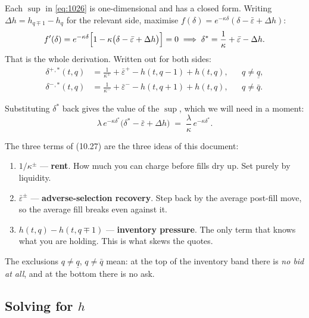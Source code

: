 \documentclass[11pt,a4paper]{article}
\newcommand{\dplus}{\delta^{+}}
\newcommand{\dminus}{\delta^{-}}
\newcommand{\epsb}{\bar{\varepsilon}}
\begin{document}
Each $\sup$ in \eqref{eq:1026} is one-dimensional and has a closed form. Writing
$\Delta h = h_{q\mp1} - h_q$ for the relevant side, maximise
$f(\delta) = e^{-\kappa\delta}(\delta - \epsb + \Delta h)$:
\[
  f'(\delta) = e^{-\kappa\delta}\Bigl[1 - \kappa\bigl(\delta - \epsb + \Delta h\bigr)\Bigr] = 0
  \;\Longrightarrow\;
  \delta^{*} = \frac{1}{\kappa} + \epsb - \Delta h .
\]
That is the whole derivation. Written out for both sides:
\begin{equation}
\boxed{
\begin{aligned}
  \dplus{}^{,*}(t,q) &= \frac{1}{\kappa^{+}} + \epsb^{+} - h(t,q-1) + h(t,q),
    &&q \ne \underline{q},\\[2pt]
  \dminus{}^{,*}(t,q) &= \frac{1}{\kappa^{-}} + \epsb^{-} - h(t,q+1) + h(t,q),
    &&q \ne \bar{q}.
\end{aligned}}
  \tag{10.27}
  \label{eq:1027}
\end{equation}

Substituting $\delta^*$ back gives the value of the $\sup$, which we will need in
a moment:
\begin{equation}
  \lambda\, e^{-\kappa\delta^{*}}\bigl(\delta^{*} - \epsb + \Delta h\bigr)
  \;=\; \frac{\lambda}{\kappa}\, e^{-\kappa\delta^{*}} .
  \label{eq:supvalue}
\end{equation}

\begin{intuition}
The three terms of (10.27) are the three ideas of this document:
\begin{enumerate}[nosep]
  \item $1/\kappa^{\pm}$ --- \textbf{rent}. How much you can charge before fills
    dry up. Set purely by liquidity.
  \item $\epsb^{\pm}$ --- \textbf{adverse-selection recovery}. Step back by the
    average post-fill move, so the average fill breaks even against it.
  \item $h(t,q) - h(t,q\mp1)$ --- \textbf{inventory pressure}. The only term
    that knows what you are holding. This is what skews the quotes.
\end{enumerate}
The exclusions $q\ne\underline{q}$, $q\ne\bar{q}$ mean: at the top of the
inventory band there is \emph{no bid at all}, and at the bottom there is no ask.
\end{intuition}

\subsection{Solving for \texorpdfstring{$h$}{h}}
\end{document}
